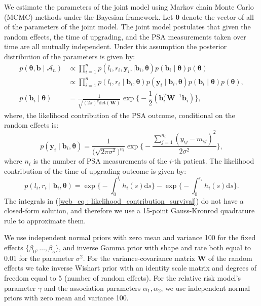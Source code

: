 We estimate the parameters of the joint model using Markov chain Monte Carlo (MCMC) methods under the Bayesian framework. Let $\boldsymbol{\theta}$ denote the vector of all of the parameters of the joint model. The joint model postulates that given the random effects, the time of upgrading, and the PSA measurements taken over time are all mutually independent. Under this assumption the posterior distribution of the parameters is given by:
\begin{align*}
p(\boldsymbol{\theta}, \boldsymbol{b} \mid \mathcal{A}_n) & \propto \prod_{i=1}^n p(l_i, r_i, \boldsymbol{y}_{i}, \mid \boldsymbol{b}_i, \boldsymbol{\theta}) p(\boldsymbol{b}_i \mid \boldsymbol{\theta}) p(\boldsymbol{\theta})\\
& \propto \prod_{i=1}^n p(l_i, r_i \mid \boldsymbol{b}_i, \boldsymbol{\theta}) p(\boldsymbol{y}_{i} \mid \boldsymbol{b}_i, \boldsymbol{\theta}) p(\boldsymbol{b}_i \mid \boldsymbol{\theta}) p(\boldsymbol{\theta}),\\
p(\boldsymbol{b}_i \mid \boldsymbol{\theta}) &= \frac{1}{\sqrt{(2 \pi)^q \text{det}(\boldsymbol{W})}} \exp\bigg\{-\dfrac{1}{2}(\boldsymbol{b}_i^T \boldsymbol{W}^{-1} \boldsymbol{b}_i)\bigg\},
\end{align*}
where, the likelihood contribution of the PSA outcome, conditional on the random effects is:
\begin{equation*}
p(\boldsymbol{y}_{i} \mid \boldsymbol{b}_i, \boldsymbol{\theta}) = \frac{1}{\big(\sqrt{2 \pi \sigma^2}\big)^{n_{i}}} \exp\bigg\{-\frac{\sum_{j=1}^{n_i}{({y}_{ij} - {m}_{ij})}^2}{2\sigma^2}\bigg\},
\end{equation*}
where $n_i$ is the number of PSA measurements of the $i$-th patient. The likelihood contribution of the time of upgrading outcome is given by:
\begin{equation}
\label{web_eq : likelihood_contribution_survival}
p(l_i,r_i\mid \boldsymbol{b}_i,\boldsymbol{\theta}) = \exp\Big\{-\int_0^{l_i} h_i(s)\mathrm{d}{s}\Big\} - \exp\Big\{-\int_0^{r_i}h_i(s)\mathrm{d}{s}\Big\}.
\end{equation}
The integrals in (\ref{web_eq : likelihood_contribution_survival}) do not have a closed-form solution, and therefore we use a 15-point Gauss-Kronrod quadrature rule to approximate them.

We use independent normal priors with zero mean and variance 100 for the fixed effects $\{\beta_{0},\ldots,\beta_{5}\}$, and inverse Gamma prior with shape and rate both equal to 0.01 for the parameter $\sigma^2$. For the variance-covariance matrix $\boldsymbol{W}$ of the random effects we take inverse Wishart prior with an identity scale matrix and degrees of freedom equal to 5 (number of random effects). For the relative risk model's parameter $\gamma$ and the association parameters $\alpha_{1}, \alpha_{2}$, we use independent normal priors with zero mean and variance 100.

